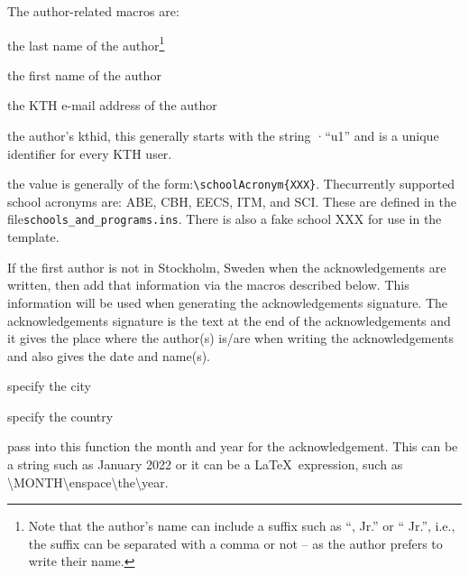 \documentclass[examplethesis.tex]{subfiles}
\begin{document}
The author-related macros are:
\begin{description}[leftmargin=!, labelwidth =\widthof{\texttt{\textbackslash secondAuthorsFirstname\{\}}}]
\item [\texttt{\textbackslash authorsLastname\{\}}] the last name of the author\footnote{Note that the author's name can include a suffix such as ``, Jr.'' or `` Jr.'', i.e., the suffix can be separated with a comma or not -- as the author prefers to write their name.}

\item [\texttt{\textbackslash authorsFirstname\{\}}] the first name of the author

\item [\texttt{\textbackslash email\{\}}] the KTH e-mail address of the author

\item [\texttt{\textbackslash kthid\{\}}] the author's kthid, this generally starts with the string ·``u1'' and is a unique identifier for every KTH user.

\item [\texttt{\textbackslash authorsSchool\{\}}] the value is generally of the form:\linebreak[4] \texttt{\textbackslash schoolAcronym\{XXX\}}. The\linebreak[4] currently supported school acronyms are: ABE, CBH, EECS, ITM, and SCI. These are defined in the file\linebreak[4] \texttt{schools\_and\_programs.ins}. There is also a fake school XXX for use in the template.
\end{description}

If the first author is not in Stockholm, Sweden when the acknowledgements are written, then add that information via the macros described below.
This information will be used when generating the acknowledgements signature. The acknowledgements signature is the text at the end of the acknowledgements and it gives the place where the author(s) is/are when writing the acknowledgements and also gives the date and name(s).
\begin{description}[leftmargin=!, labelwidth =\widthof{\texttt{\textbackslash secondAuthorsFirstname\{\}}}]
\item [\texttt{\textbackslash authorCity\{A City\}}] specify the city

\item [\texttt{\textbackslash authorCountry\{A Country\}}] specify the country

\item [\texttt{\textbackslash authorCityCountryDate\{\}}] pass into this function the month and year for the acknowledgement. This can be a string such as January 2022 or it can be a \LaTeX\  expression, such as \textbackslash MONTH\textbackslash enspace\textbackslash the\textbackslash year.
\end{description}
\end{document}
